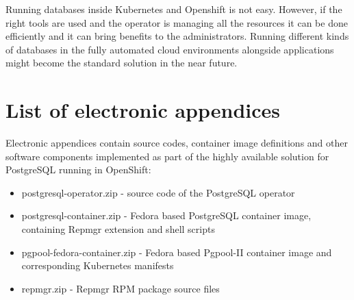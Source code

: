 \documentclass[
  digital, %
  twoside, %
  table,   %
  lof,     %
  lot,     %
]{fithesis3}
\begin{document}
Running databases inside Kubernetes and Openshift is not easy. However, if the right tools are used and the operator is managing all the resources it can be done efficiently and it can bring benefits to the administrators. Running different kinds of databases in the fully automated cloud environments alongside applications might become the standard solution in the near future.


\appendix %
\chapter{List of electronic appendices} \label{chap:appendices}
Electronic appendices contain source codes, container image definitions and other software components implemented as part of the highly available solution for PostgreSQL running in OpenShift:
\begin{itemize}
  \item postgresql-operator.zip - source code of the PostgreSQL operator
  \item postgresql-container.zip - Fedora based PostgreSQL container image, containing Repmgr extension and shell scripts
  \item pgpool-fedora-container.zip - Fedora based Pgpool-II container image and corresponding Kubernetes manifests
  \item repmgr.zip - Repmgr RPM package source files
\end{itemize}
\end{document}
